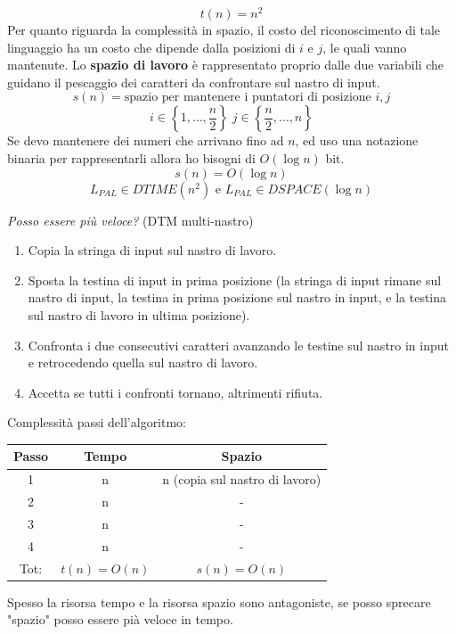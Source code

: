 \documentclass{article}
\begin{document}
$$t(n)=n^2$$
Per quanto riguarda la complessità in spazio, il costo del riconoscimento di tale
linguaggio ha un costo che dipende dalla posizioni di $i$ e $j$, le quali vanno
mantenute. Lo \textbf{spazio di lavoro} è rappresentato proprio dalle due variabili
che guidano il pescaggio dei caratteri da confrontare sul nastro di input.
$$s(n)=\text{spazio per mantenere i puntatori di posizione }i,j$$
$$i\in\left\{1,\dots,\frac{n}{2}\right\}\;j\in\left\{\frac{n}{2},\dots,n\right\}$$
Se devo mantenere dei numeri che arrivano fino ad $n$, ed uso una notazione binaria
per rappresentarli allora ho bisogni di $O(\log n)$ bit.
$$s(n)=O(\log n)$$
$$L_{PAL}\in DTIME(n^2)\text{ e }L_{PAL}\in DSPACE(\log n)$$

\noindent\textit{Posso essere più veloce?} (DTM multi-nastro)
\begin{enumerate}
    \item Copia la stringa di input sul nastro di lavoro.
    \item Sposta la testina di input in prima posizione (la stringa di input rimane
          sul nastro di input, la testina in prima posizione sul nastro in input, e la testina
          sul nastro di lavoro in ultima posizione).
    \item Confronta i due consecutivi caratteri avanzando le testine sul nastro in input
          e retrocedendo quella sul nastro di lavoro.
    \item Accetta se tutti i confronti tornano, altrimenti rifiuta.
\end{enumerate}
Complessità passi dell'algoritmo:
\begin{center}
    \begin{tabular}{c c c}
        Passo & Tempo       & Spazio                         \\
        \midrule
        1     & n           & n (copia sul nastro di lavoro) \\
        2     & n           & -                              \\
        3     & n           & -                              \\
        4     & n           & -                              \\
        \midrule
        Tot:  & $t(n)=O(n)$ & $s(n)=O(n)$
    \end{tabular}
\end{center}
Spesso la risorsa tempo e la risorsa spazio sono antagoniste, se posso sprecare "spazio"
posso essere pià veloce in tempo.
\end{document}
